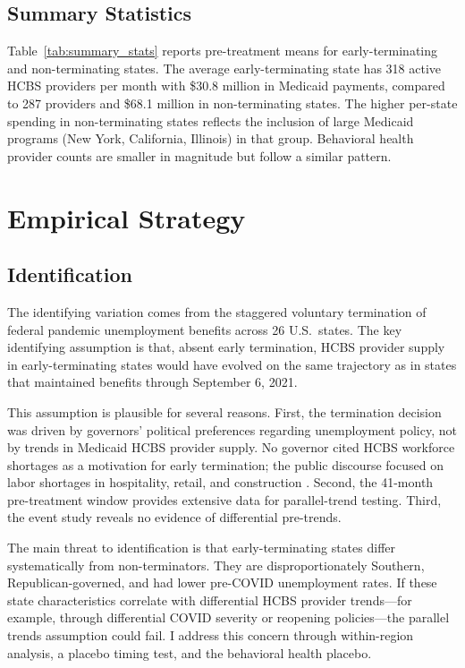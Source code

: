 \documentclass[12pt]{article}
\begin{document}
\subsection{Summary Statistics}

Table~\ref{tab:summary_stats} reports pre-treatment means for early-terminating and non-terminating states. The average early-terminating state has 318 active HCBS providers per month with \$30.8 million in Medicaid payments, compared to 287 providers and \$68.1 million in non-terminating states. The higher per-state spending in non-terminating states reflects the inclusion of large Medicaid programs (New York, California, Illinois) in that group. Behavioral health provider counts are smaller in magnitude but follow a similar pattern.




\section{Empirical Strategy}

\subsection{Identification}

The identifying variation comes from the staggered voluntary termination of federal pandemic unemployment benefits across 26 U.S.\ states. The key identifying assumption is that, absent early termination, HCBS provider supply in early-terminating states would have evolved on the same trajectory as in states that maintained benefits through September 6, 2021.

This assumption is plausible for several reasons. First, the termination decision was driven by governors' political preferences regarding unemployment policy, not by trends in Medicaid HCBS provider supply. No governor cited HCBS workforce shortages as a motivation for early termination; the public discourse focused on labor shortages in hospitality, retail, and construction \citep{holzer2021}. Second, the 41-month pre-treatment window provides extensive data for parallel-trend testing. Third, the event study reveals no evidence of differential pre-trends.

The main threat to identification is that early-terminating states differ systematically from non-terminators. They are disproportionately Southern, Republican-governed, and had lower pre-COVID unemployment rates. If these state characteristics correlate with differential HCBS provider trends---for example, through differential COVID severity or reopening policies---the parallel trends assumption could fail. I address this concern through within-region analysis, a placebo timing test, and the behavioral health placebo.
\end{document}
